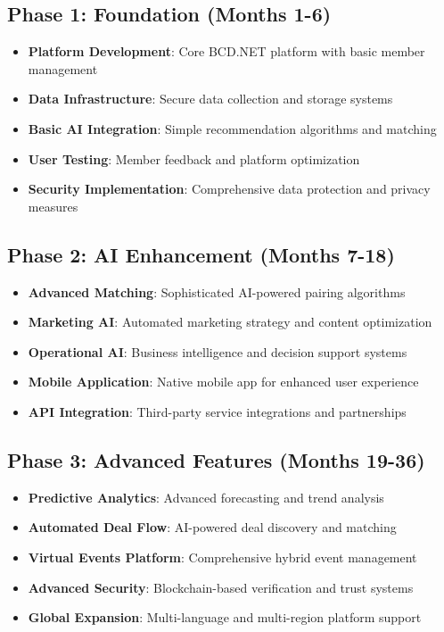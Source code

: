 \subsection{Phase 1: Foundation (Months 1-6)}
\begin{itemize}
    \item \textbf{Platform Development}: Core BCD.NET platform with basic member management
    \item \textbf{Data Infrastructure}: Secure data collection and storage systems
    \item \textbf{Basic AI Integration}: Simple recommendation algorithms and matching
    \item \textbf{User Testing}: Member feedback and platform optimization
    \item \textbf{Security Implementation}: Comprehensive data protection and privacy measures
\end{itemize}

\subsection{Phase 2: AI Enhancement (Months 7-18)}
\begin{itemize}
    \item \textbf{Advanced Matching}: Sophisticated AI-powered pairing algorithms
    \item \textbf{Marketing AI}: Automated marketing strategy and content optimization
    \item \textbf{Operational AI}: Business intelligence and decision support systems
    \item \textbf{Mobile Application}: Native mobile app for enhanced user experience
    \item \textbf{API Integration}: Third-party service integrations and partnerships
\end{itemize}

\subsection{Phase 3: Advanced Features (Months 19-36)}
\begin{itemize}
    \item \textbf{Predictive Analytics}: Advanced forecasting and trend analysis
    \item \textbf{Automated Deal Flow}: AI-powered deal discovery and matching
    \item \textbf{Virtual Events Platform}: Comprehensive hybrid event management
    \item \textbf{Advanced Security}: Blockchain-based verification and trust systems
    \item \textbf{Global Expansion}: Multi-language and multi-region platform support
\end{itemize}

